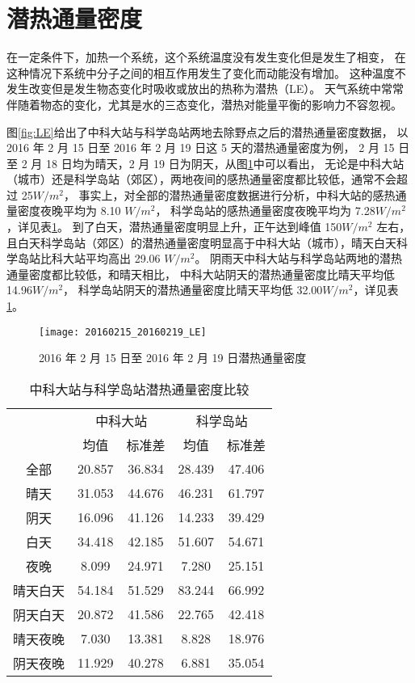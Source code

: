 \section{潜热通量密度}
在一定条件下，加热一个系统，这个系统温度没有发生变化但是发生了相变，
在这种情况下系统中分子之间的相互作用发生了变化而动能没有增加。
这种温度不发生改变但是发生物态变化时吸收或放出的热称为潜热（LE）。
天气系统中常常伴随着物态的变化，尤其是水的三态变化，潜热对能量平衡的影响力不容忽视。\cite{tagkey2006}

图\ref{fig:LE}给出了中科大站与科学岛站两地去除野点之后的潜热通量密度数据，
以 2016 年 2 月 15 日至 2016 年 2 月 19 日这 5 天的潜热通量密度为例，
2 月 15 日至 2 月 18 日均为晴天，2 月 19 日为阴天，从图\ref{fig:20160215_20160219_LE}中可以看出，
无论是中科大站（城市）还是科学岛站（郊区），两地夜间的感热通量密度都比较低，通常不会超过 25\(W/m^2\)，
事实上，对全部的潜热通量密度数据进行分析，中科大站的感热通量密度夜晚平均为 8.10 \(W/m^2\)，
科学岛站的感热通量密度夜晚平均为 7.28\(W/m^2\)，详见表\ref{tab:LE}。
到了白天，潜热通量密度明显上升，正午达到峰值 150\(W/m^2\) 左右，
且白天科学岛站（郊区）的潜热通量密度明显高于中科大站（城市），晴天白天科学岛站比科大站平均高出 29.06 \(W/m^2\)。
阴雨天中科大站与科学岛站两地的潜热通量密度都比较低，和晴天相比，
中科大站阴天的潜热通量密度比晴天平均低 14.96\(W/m^2\)，
科学岛站阴天的潜热通量密度比晴天平均低 32.00\(W/m^2\)，详见表\ref{tab:LE}。
\begin{figure}[H]
\centering
\texttt{[image: 20160215\_20160219\_LE]}
\caption{2016 年 2 月 15 日至 2016 年 2 月 19 日潜热通量密度}\label{fig:20160215_20160219_LE}
\end{figure}
\begin{table}[H]
\centering
\caption{中科大站与科学岛站潜热通量密度比较}\label{tab:LE}
\begin{tabular}{ccccc}
  \toprule
  & \multicolumn{2}{c}{中科大站} & \multicolumn{2}{c}{科学岛站}\\
  \cmidrule(r){2-3} \cmidrule(r){4-5}
  & 均值 & 标准差 & 均值 & 标准差\\
  \midrule
  全部 & 20.857 & 36.834 & 28.439 & 47.406\\
  晴天 & 31.053 & 44.676 & 46.231 & 61.797\\
  阴天 & 16.096 & 41.126 & 14.233 & 39.429\\
  白天 & 34.418 & 42.185 & 51.607 & 54.671\\
  夜晚 & 8.099 & 24.971 & 7.280 & 25.151\\
  晴天白天 & 54.184 & 51.529 & 83.244 & 66.992\\
  阴天白天 & 20.872 & 41.586 & 22.765 & 42.418\\
  晴天夜晚 & 7.030 & 13.381 & 8.828 & 18.976\\
  阴天夜晚 & 11.929 & 40.278 & 6.881 & 35.054\\
  \bottomrule
\end{tabular}
\end{table}

